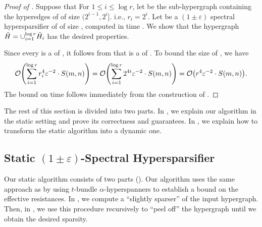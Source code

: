 \begin{proof}[Proof of ]
Suppose that 
For \( 1 \leq i \leq \log r \), let  be the sub-hypergraph containing the hyperedges of  of size \( (2^{i - 1} , 2^i] \).
i.e., \( r_i =  2^i\).
Let 
 be a \( (1 \pm \varepsilon ) \) spectral hypersparsifier of  of size , computed in time .
We show that the hypergraph \( { \tilde H} = \cup _{i = 1} ^{\log r} { \tilde H_i} \) has the desired properties.

Since every  is a \SpectralHypersparsifier{} of , it follows from  that  is a \SpectralHypersparsifier{} of .
To bound the size of , we have
\begin{equation*}
\atmost{  \sum_{i = 1} ^ {\log r} r _i ^{\ConstantR} \varepsilon ^{ - \ConstantVar } \cdot S(m, n) } 
= 
\atmost{  \sum_{i = 1} ^ {\log r} 2 ^{\ConstantR i} \varepsilon ^{ - \ConstantVar } 
 \cdot S(m, n)  }
= 
\atmost{ r^{\ConstantR} \varepsilon^{ - \ConstantVar } \cdot S(m, n) }.
\end{equation*}
The bound on time follows immediately from the construction of .
\end{proof}



The rest of this section is divided into two parts.
In , we explain our algorithm in the static setting and prove its correctness and guarantees.
In , we explain how to transform the static algorithm into a dynamic one.

\subsection{Static \( (1 \pm \varepsilon) \)-Spectral Hypersparsifier} \label{subsec:static}
Our static algorithm consists of two parts ().
Our algorithm uses the same approach as \cite{Koutis:2016aa,Abraham:2016aa,Oko:2023aa} by using \( t \)-bundle \( \alpha \)-hyperspanners to establish a bound on the effective resistances.
In , we compute a ``slightly sparser'' \SpectralHypersparsifier{} of the input hypergraph.
Then, in , we use this procedure recursively to ``peel off'' the hypergraph until we obtain the desired sparsity.



